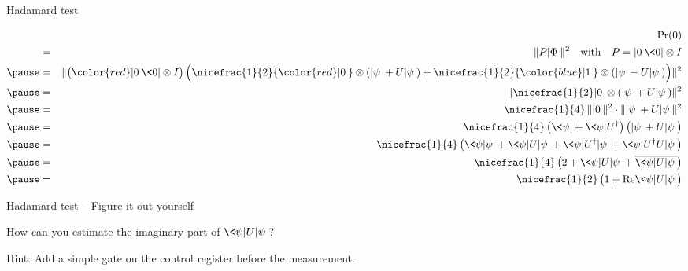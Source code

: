 \begin{frame}{Hadamard test}

\begin{eqnarray*}
& & 
\Pr(0) \\
& = & 
\| P |\Phi\> \|^2 \quad \mbox{with} \quad P = |0\>\<0| \otimes I \\ \pause
& = &
\| \big( {\color{red} |0\>\<0|} \otimes I \big) \, \Big( \nicefrac{1}{2} {\color{red} |0\>} \otimes (|\psi\> + U|\psi\>) + \nicefrac{1}{2} {\color{blue} |1\>} \otimes (|\psi\> - U |\psi\>) \Big) \|^2 \\ \pause
& = & 
\| \nicefrac{1}{2} |0\> \otimes (|\psi\> + U|\psi\>) \|^2 \\ \pause
& = &
\nicefrac{1}{4} \, \| |0\> \|^2 \cdot \| |\psi\> + U|\psi\> \|^2 \\ \pause
& = &
\nicefrac{1}{4} \, \big( \<\psi| + \<\psi|U^\dagger\big) \, \big( |\psi\> + U|\psi\> \big) \\ \pause
& = &
\nicefrac{1}{4} \, \big( \<\psi|\psi\> + \<\psi|U|\psi\> + \<\psi|U^\dagger|\psi\> + \<\psi|U^\dagger U|\psi\>\big) \\ \pause
& = & 
\nicefrac{1}{4} \, \big( 2 + \<\psi|U|\psi\> + \overline{\<\psi|U|\psi\>}\big) \\ \pause
& = &
\nicefrac{1}{2} \, \big( 1 + \mathrm{Re}\<\psi|U|\psi\> \big) \\
\end{eqnarray*}

\end{frame}




\begin{frame}{Hadamard test -- Figure it out yourself}

How can you estimate the imaginary part of $\<\psi|U|\psi\>$?

\bigskip

Hint: Add a simple gate on the control register before the measurement.

\end{frame}




